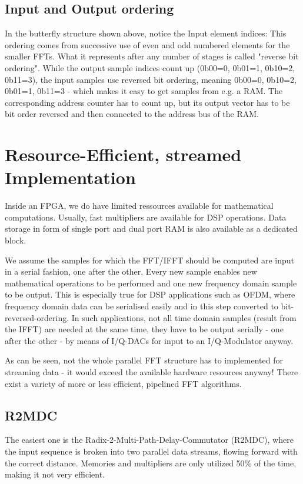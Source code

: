 \section{Input and Output ordering}
In the butterfly structure shown above, notice the Input element indices: This ordering comes from successive use of even and odd numbered elements for the smaller FFTs. What it represents after any number of stages is called "reverse bit ordering". While the output sample indices count up (0b00=0, 0b01=1, 0b10=2, 0b11=3), the input samples use reversed bit ordering, meaning 0b00=0, 0b10=2, 0b01=1, 0b11=3 - which makes it easy to get samples from e.g. a RAM. The corresponding address counter has to count up, but its output vector has to be bit order reversed and then connected to the address bus of the RAM.

\chapter{Resource-Efficient, streamed Implementation}
Inside an FPGA, we do have limited ressources available for mathematical computations. Usually, fast multipliers are available for DSP operations. Data storage in form of single port and dual port RAM is also available as a dedicated block. 

We assume the samples for which the FFT/IFFT should be computed are input in a serial fashion, one after the other. Every new sample enables new mathematical operations to be performed and one new frequency domain sample to be output. 
This is especially true for DSP applications such as OFDM, where frequency domain data can be serialised easily and in this step converted to bit-reversed-ordering. In such applications, not all time domain samples (result from the IFFT) are needed at the same time, they have to be output serially - one after the other - by means of I/Q-DACs for input to an I/Q-Modulator anyway.

As can be seen, not the whole parallel FFT structure has to implemented for streaming data - it would exceed the available hardware resources anyway! There exist a variety of more or less efficient, pipelined FFT algorithms. 

\section{R2MDC}
The easiest one is the Radix-2-Multi-Path-Delay-Commutator (R2MDC), where the input sequence is broken into two parallel data streams, flowing forward with the correct distance. Memories and multipliers are only utilized 50\% of the time, making it not very efficient.

